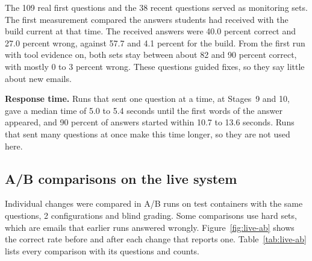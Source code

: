 The 109 real first questions and the 38 recent questions served as monitoring sets. The first measurement compared the answers students had received with the build current at that time. The received answers were 40.0 percent correct and 27.0 percent wrong, against 57.7 and 4.1 percent for the build. From the first run with tool evidence on, both sets stay between about 82 and 90 percent correct, with mostly 0 to 3 percent wrong. These questions guided fixes, so they say little about new emails.

\textbf{Response time.} Runs that sent one question at a time, at Stages~9 and 10, gave a median time of 5.0 to 5.4 seconds until the first words of the answer appeared, and 90 percent of answers started within 10.7 to 13.6 seconds. Runs that sent many questions at once make this time longer, so they are not used here.

\subsection{A/B comparisons on the live system}
\label{sec:live-ab}

Individual changes were compared in A/B runs on test containers with the same questions, 2 configurations and blind grading. Some comparisons use hard sets, which are emails that earlier runs answered wrongly. Figure~\ref{fig:live-ab} shows the correct rate before and after each change that reports one. Table~\ref{tab:live-ab} lists every comparison with its questions and counts.



